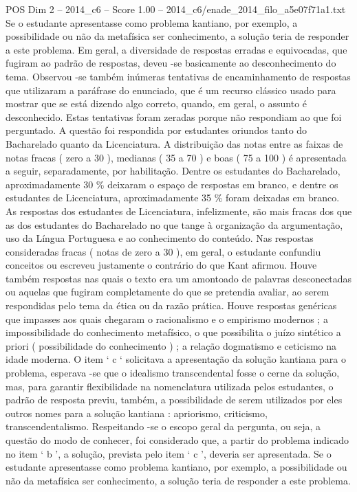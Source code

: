 \begin{textsample}{POS Dim 2 – 2014\_c6 – Score 1.00 – 2014\_c6/enade\_2014\_filo\_a5e07f71a1.txt}
Se o estudante apresentasse como problema kantiano, por exemplo, a possibilidade ou não da metafísica ser conhecimento, a solução teria de responder a este problema.
Em geral, a diversidade de respostas erradas e equivocadas, que fugiram ao padrão de respostas, deveu -se basicamente ao desconhecimento do tema.
Observou -se também inúmeras tentativas de encaminhamento de respostas que utilizaram a paráfrase do enunciado, que é um recurso clássico usado para mostrar que se está dizendo algo correto, quando, em geral, o assunto é desconhecido.
Estas tentativas foram zeradas porque não respondiam ao que foi perguntado.
A questão foi respondida por estudantes oriundos tanto do Bacharelado quanto da Licenciatura.
A distribuição das notas entre as faixas de notas fracas ( zero a 30 ), medianas ( 35 a 70 ) e boas ( 75 a 100 ) é apresentada a seguir, separadamente, por habilitação.
Dentre os estudantes do Bacharelado, aproximadamente 30 \% deixaram o espaço de respostas em branco, e dentre os estudantes de Licenciatura, aproximadamente 35 \% foram deixadas em branco.
As respostas dos estudantes de Licenciatura, infelizmente, são mais fracas dos que as dos estudantes do Bacharelado no que tange à organização da argumentação, uso da Língua Portuguesa e ao conhecimento do conteúdo.
Nas respostas consideradas fracas ( notas de zero a 30 ), em geral, o estudante confundiu conceitos ou escreveu justamente o contrário do que Kant afirmou.
Houve também respostas nas quais o texto era um amontoado de palavras desconectadas ou aquelas que fugiram completamente do que se pretendia avaliar, ao serem respondidas pelo tema da ética ou da razão prática.
Houve respostas genéricas que impasses aos quais chegaram o racionalismo e o empirismo modernos ; a impossibilidade do conhecimento metafísico, o que possibilita o juízo sintético a priori ( possibilidade do conhecimento ) ; a relação dogmatismo e ceticismo na idade moderna.
O item ‘ c ‘ solicitava a apresentação da solução kantiana para o problema, esperava -se que o idealismo transcendental fosse o cerne da solução, mas, para garantir flexibilidade na nomenclatura utilizada pelos estudantes, o padrão de resposta previu, também, a possibilidade de serem utilizados por eles outros nomes para a solução kantiana : apriorismo, criticismo, transcendentalismo.
Respeitando -se o escopo geral da pergunta, ou seja, a questão do modo de conhecer, foi considerado que, a partir do problema indicado no item ‘ b ’, a solução, prevista pelo item ‘ c ’, deveria ser apresentada.
Se o estudante apresentasse como problema kantiano, por exemplo, a possibilidade ou não da metafísica ser conhecimento, a solução teria de responder a este problema.

\end{textsample}
